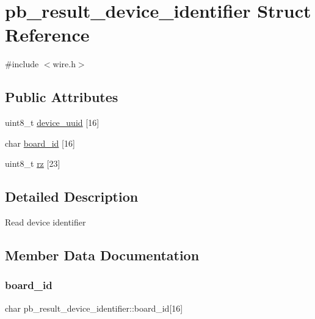 \hypertarget{structpb__result__device__identifier}{}\section{pb\+\_\+result\+\_\+device\+\_\+identifier Struct Reference}
\label{structpb__result__device__identifier}


{\ttfamily \#include $<$wire.\+h$>$}

\subsection*{Public Attributes}
\begin{DoxyCompactItemize}
\item 
uint8\+\_\+t \hyperlink{structpb__result__device__identifier_a3d7e21087287f7ff2c4b68902cc99070}{device\+\_\+uuid} \mbox{[}16\mbox{]}
\item 
char \hyperlink{structpb__result__device__identifier_a2bb6bed12674b71a651446553e365995}{board\+\_\+id} \mbox{[}16\mbox{]}
\item 
uint8\+\_\+t \hyperlink{structpb__result__device__identifier_a61f8df8d8daee46f197c754db1b9594e}{rz} \mbox{[}23\mbox{]}
\end{DoxyCompactItemize}


\subsection{Detailed Description}
Read device identifier 

\subsection{Member Data Documentation}
\mbox{\label{structpb__result__device__identifier_a2bb6bed12674b71a651446553e365995}} 
\subsubsection{\texorpdfstring{board\+\_\+id}{board\_id}}
{\footnotesize\ttfamily char pb\+\_\+result\+\_\+device\+\_\+identifier\+::board\+\_\+id\mbox{[}16\mbox{]}}

